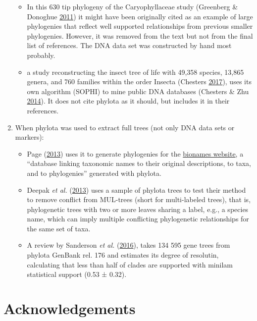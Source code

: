 \documentclass[]{article}
\providecommand{\tightlist}{%
  \setlength{\itemsep}{0pt}\setlength{\parskip}{0pt}}
\begin{document}
\begin{enumerate}
  \begin{itemize}
  \tightlist
  \item
    In this 630 tip phylogeny of the Caryophyllaceae study (Greenberg \& Donoghue \protect\hyperlink{ref-greenberg2011caryophyllaceae}{2011}) it might have been originally
    cited as an example of large phylogenies that reflect well supported relationships
    from previous smaller phylogenies. However, it was removed from the text but
    not from the final list of references. The DNA data set was constructed by hand
    most probably.
  \item
    a study reconstructing the insect tree of life with 49,358 species, 13,865
    genera, and 760 families within the order Insecta (Chesters \protect\hyperlink{ref-chesters2017construction}{2017}),
    uses its own algorithm (SOPHI) to mine public DNA databases (Chesters \& Zhu \protect\hyperlink{ref-chesters2014protocol}{2014}).
    It does not cite phylota as it should, but includes it in their references.
  \end{itemize}
\item
  When phylota was used to extract full trees (not only DNA data sets or markers):

  \begin{itemize}
  \tightlist
  \item
    Page (\protect\hyperlink{ref-page2013bionames}{2013}) uses it to generate phylogenies for the \href{http://bionames.org}{bionames website},
    a ``database linking taxonomic names to their original descriptions, to taxa, and
    to phylogenies'' generated with phylota.
  \item
    Deepak \emph{et al.} (\protect\hyperlink{ref-deepak2013extracting}{2013}) uses a sample of phylota trees to test their method to
    remove conflict from MUL-trees (short for multi-labeled trees), that is, phylogenetic
    trees with two or more leaves sharing a label, e.g., a species name, which can
    imply multiple conflicting phylogenetic relationships for the same set of taxa.
  \item
    A review by Sanderson \emph{et al.} (\protect\hyperlink{ref-sanderson2016perspective}{2016}), takes 134 595 gene trees from phylota
    GenBank rel. 176 and estimates its degree of resolutin, calculating that less
    than half of clades are supported with minilam statistical support (0.53 ± 0.32).
  \end{itemize}
\end{enumerate}

\hypertarget{acknowledgements}{%
\section{Acknowledgements}\label{acknowledgements}}
\end{document}
